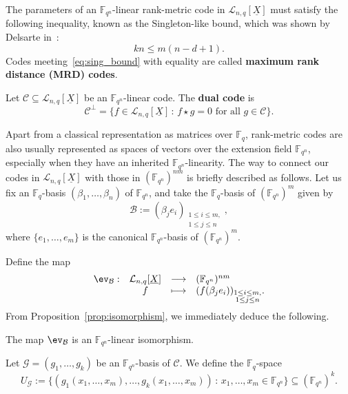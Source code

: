 The parameters of an ${\mathbb F}_{q^n}$-linear rank-metric code in $\mathcal{L}_{n,q}[\underline{X}]$ must satisfy the following  inequality, known as the Singleton-like bound, which was shown by Delsarte in~\cite{delsarte1978bilinear}:
\begin{equation}\label{eq:sing_bound}
     kn \leq m(n-d+1).
\end{equation}
Codes meeting~\eqref{eq:sing_bound} with equality are called \textbf{maximum rank distance (MRD) codes}.

Let $\mathcal{C}\subseteq \mathcal{L}_{n,q}[\underline{X}]$ be an ${\mathbb F}_{q^n}$-linear code. The \textbf{dual code} is $$\mathcal{C}^\perp=\{ f \in \mathcal{L}_{n,q}[\underline{X}] \, :\, f\star g = 0 \mbox{ for all } g \in \mathcal{C}\}.$$


Apart from a classical representation as matrices over $\mathbb{F}_q$, rank-metric codes are also usually represented as spaces of vectors over the extension field ${\mathbb F}_{q^n}$, especially when they have an inherited ${\mathbb F}_{q^n}$-linearity.  The way to connect our codes in $\mathcal{L}_{n,q}[\underline{X}]$ with those in $(\mathbb{F}_{q^n})^{nm}$ is briefly described as follows. Let us fix an $\mathbb{F}_q$-basis $(\beta_1,\ldots,\beta_n)$ of ${\mathbb F}_{q^n}$, and take the $\mathbb{F}_q$-basis of $({\mathbb F}_{q^n})^m$ given by 
\begin{equation}\label{eq:basis}\mathcal{B}:=(\beta_je_i)_{\substack{1\leq i \leq m,\\ 1 \leq j \leq n}},\end{equation}
where $\{e_1,\ldots,e_m\}$ is the canonical $\mathbb{F}_{q^n}$-basis of $(\mathbb{F}_{q^n})^m$.

Define the map
$$\begin{array}{rccl}\ev_{\mathcal{B}}:& \mathcal{L}_{n,q}[\underline{X}] & \longrightarrow & ({\mathbb F}_{q^n})^{nm} \\
&f & \longmapsto & (f(\beta_je_i))_{\substack{1\leq i \leq m,\\ 1 \leq j \leq n}}.\end{array}$$
From Proposition~\ref{prop:isomorphism}, we immediately deduce the following.
\begin{coro}
The map $\ev_{\mathcal{B}}$ is an ${\mathbb F}_{q^n}$-linear isomorphism.
\end{coro}
Let $\mathcal{G}=(g_1,\ldots, g_k)$ be an ${\mathbb F}_{q^n}$-basis of $\mathcal{C}$. We define the $\mathbb{F}_q$-space
$$ U_{\mathcal{G}}:=\{(g_1(x_1,\ldots,x_m), \ldots,g_k(x_1,\ldots,x_m) ) \, : \, x_1,\ldots,x_m \in {\mathbb F}_{q^n} \}\subseteq (\mathbb{F}_{q^n})^k. $$

